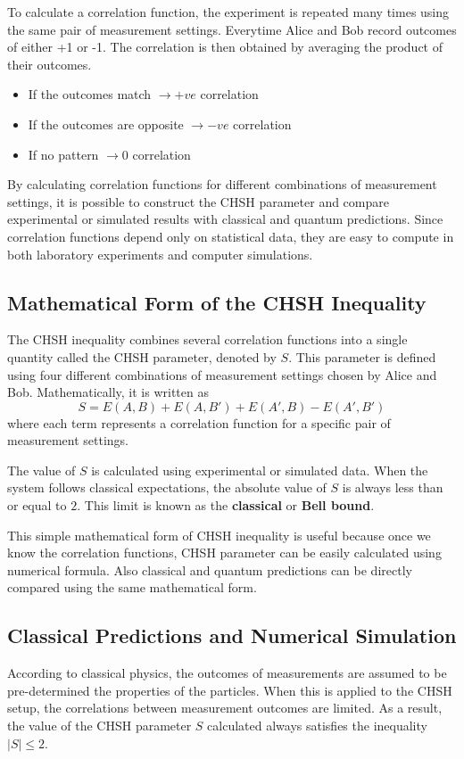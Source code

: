 \documentclass[14pt,a4paper]{extarticle}
\begin{document}
To calculate a correlation function, the experiment is repeated many times using the same pair of measurement settings. Everytime Alice and Bob record outcomes of either +1 or -1. The correlation is then obtained by averaging the product of their outcomes.
\begin{itemize}
    \item If the outcomes match $\rightarrow +ve$ correlation
    \item If the outcomes are opposite $\rightarrow -ve$ correlation
    \item If no pattern $\rightarrow 0$ correlation
\end{itemize}
By calculating correlation functions for different combinations of measurement settings, it is possible to construct the CHSH parameter and compare experimental or simulated results with classical and quantum predictions. Since correlation functions depend only on statistical data, they are easy to compute in both laboratory experiments and computer simulations.

\subsection{Mathematical Form of the CHSH Inequality}
The CHSH inequality combines several correlation functions into a single quantity called the CHSH parameter, denoted by $S$. This parameter is defined using four different combinations of measurement settings chosen by Alice and Bob. Mathematically, it is written as
\begin{equation*}
S=E(A,B)+E(A,B')+E(A',B)-E(A',B')
\end{equation*}
where each term represents a correlation function for a specific pair of measurement settings.

The value of $S$ is calculated using experimental or simulated data. When the system follows classical expectations, the absolute value of $S$ is always less than or equal to $2$. This limit is known as the \textbf{classical} or \textbf{Bell bound}.

This simple mathematical form of CHSH inequality is useful because once we know the correlation functions, CHSH parameter can be easily calculated using numerical formula. Also classical and quantum predictions can be directly compared using the same mathematical form.

\subsection{Classical Predictions and Numerical Simulation}
According to classical physics, the outcomes of measurements are assumed to be pre-determined the properties of the particles. When this is applied to the CHSH setup, the correlations between measurement outcomes are limited. As a result, the value of the CHSH parameter $S$ calculated always satisfies the inequality $|S|\leq2$.
\end{document}

